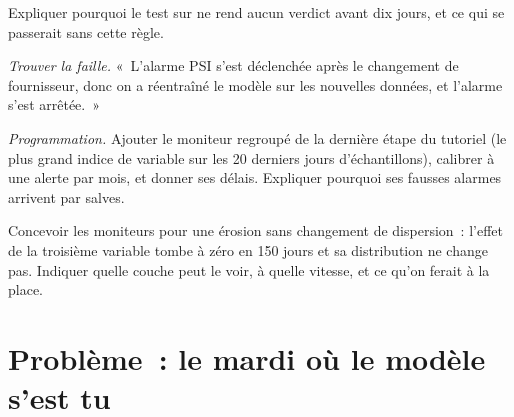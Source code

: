 \begin{exercise}[$\star\star$]\label{exo:ml:monitoring-and-retraining:5}
Expliquer pourquoi le test sur  ne rend aucun verdict avant dix jours, et ce qui se passerait sans cette règle.
\end{exercise}

\begin{exercise}[$\star\star$]\label{exo:ml:monitoring-and-retraining:6}
\emph{Trouver la faille.} «~L'alarme PSI s'est déclenchée après le changement de fournisseur, donc on a réentraîné le modèle sur les nouvelles données, et l'alarme
s'est arrêtée.~»
\end{exercise}

\begin{exercise}[$\star\star\star$]\label{exo:ml:monitoring-and-retraining:7}
\emph{Programmation.} Ajouter le moniteur regroupé de la dernière étape du tutoriel (le plus grand indice de variable sur les 20 derniers jours d'échantillons),
calibrer à une alerte par mois, et donner ses délais. Expliquer pourquoi ses fausses alarmes arrivent par salves.
\end{exercise}

\begin{exercise}[$\star\star\star$]\label{exo:ml:monitoring-and-retraining:8}
Concevoir les moniteurs pour une érosion sans changement de dispersion~: l'effet de la troisième variable tombe à zéro en 150 jours et sa
distribution ne change pas. Indiquer quelle couche peut le voir, à quelle vitesse, et ce qu'on ferait à la place.
\end{exercise}

\section{Problème~: le mardi où le modèle s'est tu}

